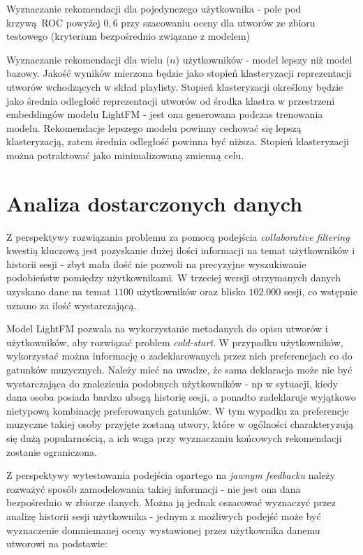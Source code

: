 \documentclass[10pt,a4paper]{article}
\begin{document}
Wyznaczanie rekomendacji dla pojedynczego użytkownika - pole pod krzywą ROC powyżej $0,6$ przy szacowaniu oceny dla utworów ze zbioru testowego (kryterium bezpośrednio związane z modelem)

Wyznaczanie rekomendacji dla wielu ($n$) użytkowników - model lepszy niż model bazowy. Jakość wyników mierzona będzie jako stopień klasteryzacji reprezentacji utworów wchodzących w skład playlisty. Stopień klasteryzacji określony będzie jako średnia odległość reprezentacji utworów od środka klastra w przestrzeni embeddingów modelu LightFM - jest ona generowana podczas trenowania modelu. Rekomendacje lepszego modelu powinny cechować się lepszą klasteryzacją, zatem średnia odległość powinna być niższa. Stopień klasteryzacji można potraktować jako minimalizowaną zmienną celu.

\section{Analiza dostarczonych danych}


Z perspektywy rozwiązania problemu za pomocą podejścia \textit{collaborative filtering} kwestią kluczową jest pozyskanie dużej ilości informacji na temat użytkowników i historii sesji - zbyt mała ilość nie pozwoli na precyzyjne wyszukiwanie podobieństw pomiędzy użytkownikami. W trzeciej wersji otrzymanych danych uzyskano dane na temat $1100$ użytkowników oraz blisko $102.000$ sesji, co wstępnie uznano za ilość wystarczającą.


Model LightFM pozwala na wykorzystanie metadanych do opisu utworów i użytkowników, aby rozwiązać problem \textit{cold-start}. W przypadku użytkowników, wykorzystać można informację o zadeklarowanych przez nich preferencjach co do gatunków muzycznych. Należy mieć na uwadze, że sama deklaracja może nie być wystarczająca do znalezienia podobnych użytkowników - np w sytuacji, kiedy dana osoba posiada bardzo ubogą historię sesji, a ponadto zadeklaruje wyjątkowo nietypową kombinację preferowanych gatunków. W tym wypadku za preferencje muzyczne takiej osoby przyjęte zostaną utwory, które w ogólności charakteryzują się dużą popularnością, a ich waga przy wyznaczaniu końcowych rekomendacji zostanie ograniczona. 

Z perspektywy wytestowania podejścia opartego na \textit{jawnym feedbacku} należy rozważyć sposób zamodelowania takiej informacji - nie jest ona dana bezpośrednio w zbiorze danych. Można ją jednak oszacować wyznaczyć przez analizę historii sesji użytkownika - jednym z możliwych podejść może być wyznaczenie domniemanej oceny wystawionej przez użytkownika danemu utworowi na podstawie:
\end{document}
